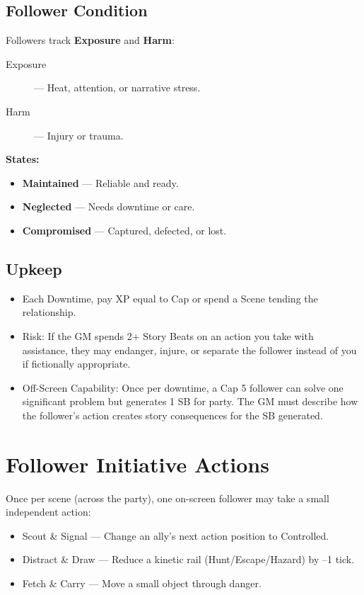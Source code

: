 \subsection*{Follower Condition}

Followers track \textbf{Exposure} and \textbf{Harm}:

\begin{description}
  \item[Exposure] — Heat, attention, or narrative stress.
  \item[Harm] — Injury or trauma.
\end{description}

\textbf{States:}
\begin{itemize}
  \item \textbf{Maintained} — Reliable and ready.
  \item \textbf{Neglected} — Needs downtime or care.
  \item \textbf{Compromised} — Captured, defected, or lost.
\end{itemize}

\subsection*{Upkeep}

\begin{itemize}
  \item Each Downtime, pay XP equal to Cap or spend a Scene tending the relationship.
  \item Risk: If the GM spends 2+ Story Beats  on an action you take with assistance, they may endanger, injure, or separate the follower instead of you if fictionally appropriate.
  \item Off-Screen Capability: Once per downtime, a Cap 5 follower can solve one significant problem but generates 1 SB for party. The GM must describe how the follower's action creates story consequences for the SB generated.
\end{itemize}

\section{Follower Initiative Actions}

Once per scene (across the party), one on-screen follower may take a small independent action:

\begin{itemize}
  \item Scout \& Signal — Change an ally's next action position to Controlled.
  \item Distract \& Draw — Reduce a kinetic rail (Hunt/Escape/Hazard) by –1 tick.
  \item Fetch \& Carry — Move a small object through danger.
\end{itemize}

